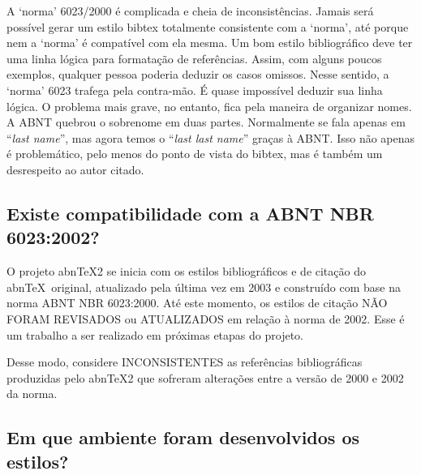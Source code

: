 \documentclass[a4paper]{ltxdoc}
\newcommand{\abnTeX}{abn\TeX}
\begin{document}
A `norma' 6023/2000\cite{NBR6023:2000} é complicada e cheia de inconsistências.
Jamais será possível gerar um estilo \textsf{bibtex} totalmente consistente com
a `norma', até porque nem a `norma' é compatível com ela mesma. Um bom estilo bibliográfico
deve ter uma linha lógica para formatação de referências. Assim, com alguns
poucos exemplos, qualquer pessoa poderia deduzir os casos omissos. Nesse
sentido, a `norma' 6023 trafega pela contra-mão. É quase impossível deduzir sua
linha lógica. O problema mais grave, no entanto, fica pela maneira de organizar
nomes. A ABNT quebrou o sobrenome em duas partes. Normalmente se fala apenas em
``\textit{last name}'', mas agora temos o ``\textit{last last name}'' graças à
ABNT. Isso não apenas é problemático, pelo menos do ponto de vista do
\textsf{bibtex}, mas é também um desrespeito ao autor citado.


\subsection{Existe compatibilidade com a ABNT NBR 6023:2002?}

O projeto \abnTeX2 se inicia com os estilos bibliográficos e de citação do
\abnTeX\ original, atualizado pela última vez em 2003 e construído com base na
norma ABNT NBR 6023:2000. Até este momento, os estilos de citação NÃO FORAM
REVISADOS ou ATUALIZADOS em relação à norma de 2002. Esse é um trabalho a ser
realizado em próximas etapas do projeto.

Desse modo, considere INCONSISTENTES as referências bibliográficas produzidas
pelo \abnTeX2 que sofreram alterações entre a versão de 2000 e 2002 da norma.

\subsection{Em que ambiente foram desenvolvidos os estilos?}
\end{document}
